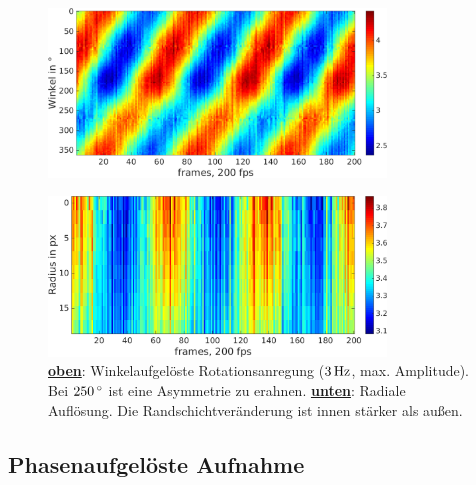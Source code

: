 \documentclass[numbers=noenddot,a4paper]{scrartcl}
\newcommand{\degree}{^\circ}
\newcommand{\fett}[1]{\textbf{#1}}
\begin{document}
            \begin{figure}[H]
                    \centering
                    \includegraphics[width=0.8\textwidth,height=0.25\textheight]{figs/glowbeispielrotation3Hzang.png}
            \end{figure}

        \vspace{-0.5cm}

            \begin{figure}[H]
                    \centering
                    \includegraphics[width=0.8\textwidth,height=0.25\textheight]{figs/glowbeispielrotation3Hzrad.png}
                    \caption{\underline{\fett{oben}}: Winkelaufgelöste Rotationsanregung ($\unit[3]{Hz}$, max. Amplitude). Bei $\unit[250]{\degree}$ ist eine Asymmetrie zu erahnen. \underline{\fett{unten}}: Radiale Auflösung. Die Randschichtveränderung ist innen stärker als außen.}
                    \label{img:glowanalys}
            \end{figure}
            
		\subsection{Phasenaufgelöste Aufnahme}
\end{document}
